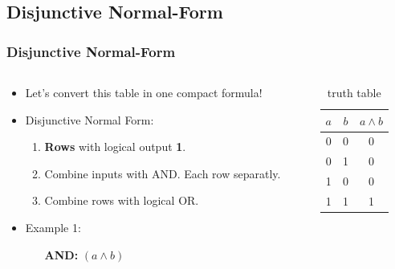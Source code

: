 \documentclass{beamer}
\begin{document}
\subsection{Disjunctive Normal-Form}
\begin{frame}\frametitle{Disjunctive Normal-Form}
  
  \begin{columns}
  \begin{column}{6cm}
  \begin{itemize}
    \item Let's convert this table in one compact formula!
    \item Disjunctive Normal Form:
    \begin{enumerate}
     \item \textbf{Rows} with logical output \textbf{1}.
     \item Combine inputs with AND. Each row separatly.
     \item Combine rows with logical OR.
    \end{enumerate}
    \item Example 1: 
    \begin{itemize}
      \item [\textbf{AND:}]$(a\land b)$
    \end{itemize}
  \end{itemize}
  \end{column}
  
    
  \begin{column}{6cm}
  \begin{table}[H]
  \centering
  \begin{tabular}{c|c||c}
  \textbf{$a$} & \textbf{$b$} & \textbf{$a\land b$} \\ \hline
  0          & 0          & 0      \\
  0          & 1          & 0  \\
  1          & 0          & 0   \\
  1          & 1          & 1 
  \end{tabular}
  \caption{truth table}
  \label{tab:truth4}
  \end{table}
  \end{column}
  
  \end{columns}  
\end{frame}
\end{document}
